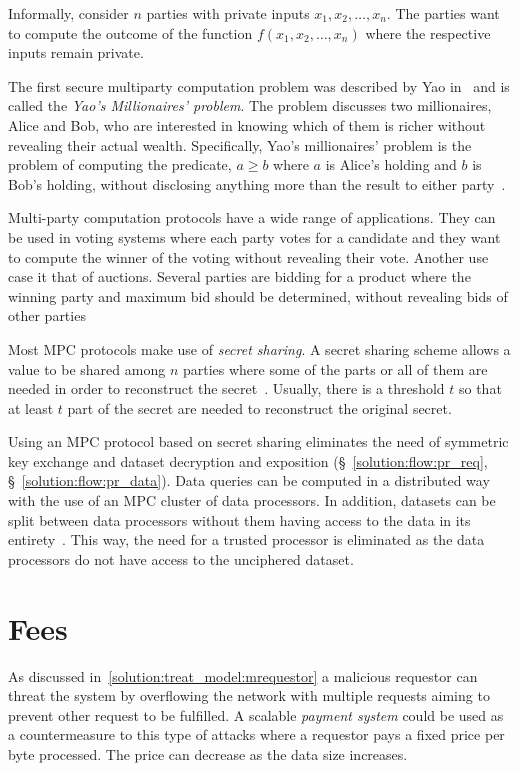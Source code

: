 Informally, consider $n$ parties with private inputs $x_1, x_2, \dots, x_n$. The parties want to compute the outcome of the function $f(x_1, x_2, \dots, x_n)$ where the respective inputs remain private.

The first secure multiparty computation problem was described by Yao in~\cite{Yao:1982:PSC:1398511.1382751} and is called the \textit{Yao's Millionaires' problem}. The problem discusses two millionaires, Alice and Bob, who are interested in knowing which of them is richer without revealing their actual wealth. Specifically, Yao’s millionaires’ problem is the problem of computing the predicate, $a \geq b$ where $a$ is Alice's holding and $b$ is Bob's holding, without disclosing anything more than the result to either party~\cite{mpc_ioannidis}.

Multi-party computation protocols have a wide range of applications. They can be used in voting systems where each party votes for a candidate and they want to compute the winner of the voting without revealing their vote. Another use case it that of auctions. Several parties are bidding for a product where the winning party and maximum bid should be determined, without revealing bids of other parties

Most MPC protocols make use of \textit{secret sharing}. A secret sharing scheme allows a value to be shared among $n$ parties where some of the parts or all of them are needed in order to reconstruct the secret~\cite{Kamm:2015:ASM:2836836}. Usually, there is a threshold $t$ so that at least $t$ part of the secret are needed to reconstruct the original secret.

Using an MPC protocol based on secret sharing eliminates the need of symmetric key exchange and dataset decryption and exposition (§~\ref{solution:flow:pr_req}, §~\ref{solution:flow:pr_data}). Data queries can be computed in a distributed way with the use of an MPC cluster of data processors. In addition, datasets can be split between data processors without them having access to the data in its entirety~\cite{DBLP:journals/corr/ZyskindNP15}. This way, the need for a trusted processor is eliminated as the data processors do not have access to the unciphered dataset.

\section{Fees}
\label{future_work:fees}

As discussed in~\ref{solution:treat_model:mrequestor} a malicious requestor can threat the system by overflowing the network with multiple requests aiming to prevent other request to be fulfilled. A scalable \textit{payment system} could be used as a countermeasure to this type of attacks where a requestor pays a fixed price per byte processed. The price can decrease as the data size increases.

